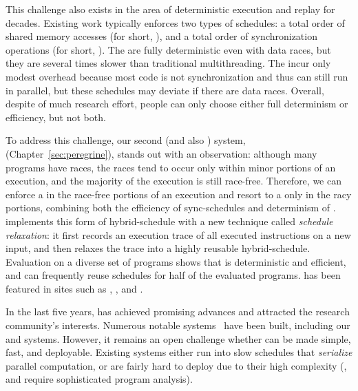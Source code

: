  This challenge also exists in the area of deterministic
execution and replay for decades. Existing work typically enforces two types of
schedules: a total order of shared memory accesses (for short, \memsched), and a
total order of synchronization operations (for short, \syncsched). The
\memscheds are fully deterministic even with data races, but they are several
times slower than traditional multithreading. The \syncscheds incur only modest
overhead because most code is not synchronization and thus can still run in
parallel, but these schedules may deviate if there are data races. Overall,
despite of much research effort, people can only choose either full determinism or
efficiency, but not both.

To address this challenge, our second \smt (and also \dmt) system,
\peregrine~\cite{peregrine:sosp11} (Chapter~\ref{sec:peregrine}), stands out
with an observation: although many programs have races, the races tend to occur
only within minor portions of an execution, and the majority of the execution is
still race-free. Therefore, we can enforce a \syncscheds in the race-free
portions of an execution and resort to a \memsched only in the racy portions,
combining both the efficiency of sync-schedules and determinism of \memscheds. 
\peregrine implements this form of hybrid-schedule with a new technique called
\emph{schedule relaxation}: it first records an execution trace of
all executed instructions on a new input, and then relaxes the trace into a
highly reusable hybrid-schedule. Evaluation on a diverse set of programs shows
that \peregrine is deterministic and efficient, and can frequently reuse
schedules for half of the evaluated programs. \peregrine has been featured in
sites such as \acmtechnews, \tgdaily, and \physorg.

 In the last
five years, \smt has achieved promising advances and attracted the research
community's interests. Numerous notable \smt systems~\cite{determinator:osdi10,
cui:tern:osdi10, peregrine:sosp11, dthreads:sosp11, bergan:oopsla13} have been
built, including our \tern and \peregrine systems. However, it remains an open
challenge whether \smt can be made simple, fast, and deployable. Existing \smt
systems either run into slow schedules that \emph{serialize} parallel
computation, or are fairly hard to deploy due to their high complexity (\eg,
\tern and \peregrine require sophisticated program analysis).

